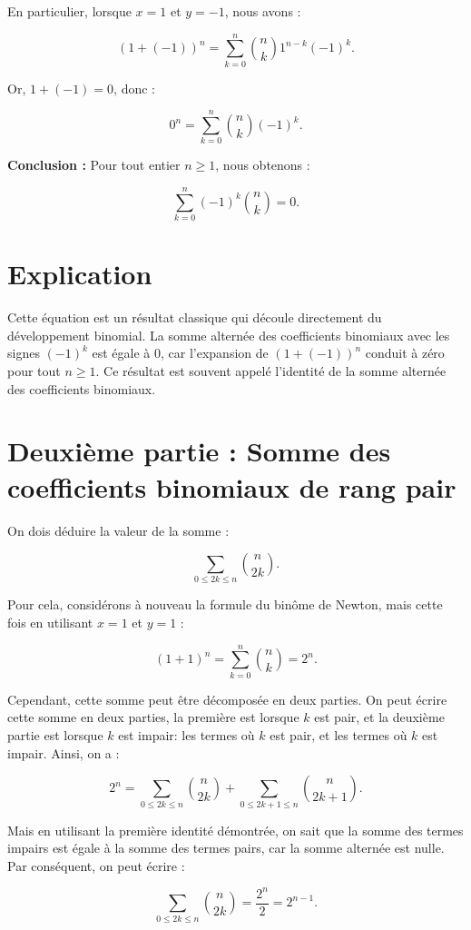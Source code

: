 \documentclass[a4paper,oneside,12pt]{amsbook}
\theoremstyle{definition}
\theoremstyle{remark}
\begin{document}
En particulier, lorsque \(x = 1\) et \(y = -1\), nous avons :

\[
(1 + (-1))^n = \sum_{k=0}^n \binom{n}{k} 1^{n-k} (-1)^k.
\]

Or, \(1 + (-1) = 0\), donc :

\[
0^n = \sum_{k=0}^n \binom{n}{k} (-1)^k.
\]

\textbf{Conclusion :} Pour tout entier \(n \geq 1\), nous obtenons :

\[
\sum_{k=0}^n (-1)^k \binom{n}{k} = 0.
\]

\section*{Explication}

Cette équation est un résultat classique qui découle directement du développement binomial. La somme alternée des coefficients binomiaux avec les signes \((-1)^k\) est égale à 0, car l'expansion de \((1 + (-1))^n\) conduit à zéro pour tout \(n \geq 1\). Ce résultat est souvent appelé l'identité de la somme alternée des coefficients binomiaux.

\section*{Deuxième partie : Somme des coefficients binomiaux de rang pair}

On dois déduire la valeur de la somme :

\[
\sum_{0 \leq 2k \leq n} \binom{n}{2k}.
\]

Pour cela, considérons à nouveau la formule du binôme de Newton, mais cette fois en utilisant \(x = 1\) et \(y = 1\) :

\[
(1 + 1)^n = \sum_{k=0}^n \binom{n}{k} = 2^n.
\]

Cependant, cette somme peut être décomposée en deux parties. On peut écrire cette somme en deux parties, la première est lorsque $k$ est pair, et la deuxième partie est lorsque $k$ est impair: les termes où \(k\) est pair, et les termes où \(k\) est impair. Ainsi, on a :

\[
2^n = \sum_{0 \leq 2k \leq n} \binom{n}{2k} + \sum_{0 \leq 2k+1 \leq n} \binom{n}{2k+1}.
\]

Mais en utilisant la première identité démontrée, on sait que la somme des termes impairs est égale à la somme des termes pairs, car la somme alternée est nulle. Par conséquent, on peut écrire :

\[
\sum_{0 \leq 2k \leq n} \binom{n}{2k} = \frac{2^n}{2} = 2^{n-1}.
\]
\end{document}
